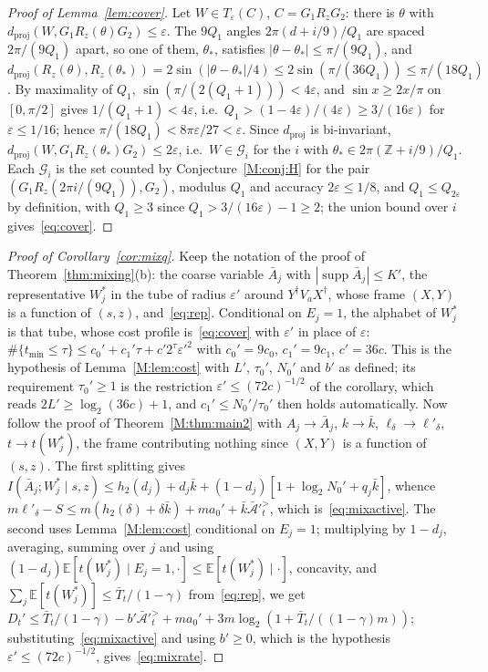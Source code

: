 \documentclass[aps,prx,twocolumn,superscriptaddress,nofootinbib,longbibliography]{revtex4-2}
\theoremstyle{plain}
\theoremstyle{definition}
\theoremstyle{remark}
\newcommand{\dproj}{d_{\mathrm{proj}}}
\newcommand{\E}{\mathbb{E}}
\newcommand{\Z}{\mathbb{Z}}
\newcommand{\supp}{\operatorname{supp}}
\begin{document}
\begin{proof}[Proof of Lemma~\ref{lem:cover}]
Let $W\in T_\varepsilon(C)$, $C=G_1R_zG_2$: there is $\theta$ with $\dproj(W,G_1R_z(\theta)G_2)\le\varepsilon$. The $9Q_1$ angles $2\pi(d+i/9)/Q_1$ are spaced $2\pi/(9Q_1)$ apart, so one of them, $\theta_*$, satisfies $|\theta-\theta_*|\le\pi/(9Q_1)$, and $\dproj(R_z(\theta),R_z(\theta_*))=2\sin(|\theta-\theta_*|/4)\le2\sin(\pi/(36Q_1))\le\pi/(18Q_1)$. By maximality of $Q_1$, $\sin(\pi/(2(Q_1+1)))<4\varepsilon$, and $\sin x\ge2x/\pi$ on $[0,\pi/2]$ gives $1/(Q_1+1)<4\varepsilon$, i.e.\ $Q_1>(1-4\varepsilon)/(4\varepsilon)\ge3/(16\varepsilon)$ for $\varepsilon\le1/16$; hence $\pi/(18Q_1)<8\pi\varepsilon/27<\varepsilon$. Since $\dproj$ is bi-invariant, $\dproj(W,G_1R_z(\theta_*)G_2)\le2\varepsilon$, i.e.\ $W\in\mathcal G_i$ for the $i$ with $\theta_*\in2\pi(\Z+i/9)/Q_1$. Each $\mathcal G_i$ is the set counted by Conjecture~\ref{M:conj:H} for the pair $(G_1R_z(2\pi i/(9Q_1)),G_2)$, modulus $Q_1$ and accuracy $2\varepsilon\le1/8$, and $Q_1\le Q_{2\varepsilon}$ by definition, with $Q_1\ge3$ since $Q_1>3/(16\varepsilon)-1\ge2$; the union bound over $i$ gives~\eqref{eq:cover}.
\end{proof}

\begin{proof}[Proof of Corollary~\ref{cor:mixq}]
Keep the notation of the proof of Theorem~\ref{thm:mixing}(b): the coarse variable $\bar A_j$ with $|\supp\bar A_j|\le K'$, the representative $W^*_j$ in the tube of radius $\varepsilon'$ around $Y^\dagger V_aX^\dagger$, whose frame $(X,Y)$ is a function of $(s,z)$, and~\eqref{eq:rep}. Conditional on $E_j=1$, the alphabet of $W^*_j$ is that tube, whose cost profile is~\eqref{eq:cover} with $\varepsilon'$ in place of $\varepsilon$: $\#\{t_{\min}\le\tau\}\le c_0'+c_1'\tau+c'2^\tau\varepsilon'^2$ with $c_0'=9c_0$, $c_1'=9c_1$, $c'=36c$. This is the hypothesis of Lemma~\ref{M:lem:cost} with $L'$, $\tau_0'$, $N_0'$ and $b'$ as defined; its requirement $\tau_0'\ge1$ is the restriction $\varepsilon'\le(72c)^{-1/2}$ of the corollary, which reads $2L'\ge\log_2(36c)+1$, and $c_1'\le N_0'/\tau_0'$ then holds automatically. Now follow the proof of Theorem~\ref{M:thm:main2} with $A_j\to\bar A_j$, $k\to\bar k$, $\ell_\delta\to\ell'_\delta$, $t\to t(W^*_j)$, the frame contributing nothing since $(X,Y)$ is a function of $(s,z)$. The first splitting gives $I(\bar A_j;W^*_j\mid s,z)\le h_2(d_j)+d_j\bar k+(1-d_j)[1+\log_2N_0'+q_j\bar k]$, whence $m\ell'_\delta-S\le m(h_2(\delta)+\delta\bar k)+ma_0'+\bar k\bar{\mathcal A}'^{>}_t$, which is~\eqref{eq:mixactive}. The second uses Lemma~\ref{M:lem:cost} conditional on $E_j=1$; multiplying by $1-d_j$, averaging, summing over $j$ and using $(1-d_j)\E[t(W^*_j)\mid E_j=1,\cdot]\le\E[t(W^*_j)\mid\cdot]$, concavity, and $\sum_j\E[t(W^*_j)]\le\bar T_t/(1-\gamma)$ from~\eqref{eq:rep}, we get $D_t'\le\bar T_t/(1-\gamma)-b'\bar{\mathcal A}'^{>}_t+ma_0'+3m\log_2(1+\bar T_t/((1-\gamma)m))$; substituting~\eqref{eq:mixactive} and using $b'\ge0$, which is the hypothesis $\varepsilon'\le(72c)^{-1/2}$, gives~\eqref{eq:mixrate}.
\end{proof}
\end{document}
